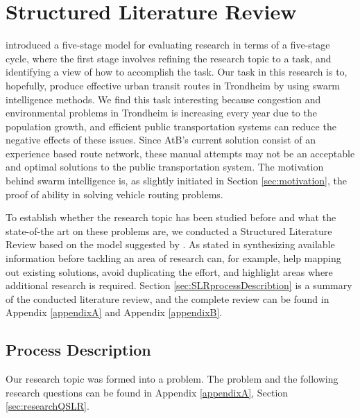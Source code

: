 \section{Structured Literature Review}
\label{sec:structuredLiteratureReview}

\citet{cohen88} introduced a five-stage model for evaluating research in terms of a five-stage cycle, where the first stage involves refining the research topic to a task, and identifying a view of how to accomplish the task. %
Our task in this research is to, hopefully, produce effective urban transit routes in Trondheim by using swarm intelligence methods. We find this task interesting because congestion and environmental problems in Trondheim is increasing every year due to the population growth\citep{website:miljopakken}, and efficient public transportation systems can reduce the negative effects of these issues. Since AtB's\citet{website:atb} current solution consist of an experience based route network, these manual attempts may not be an acceptable and optimal solutions to the public transportation system. The motivation behind swarm intelligence is, as slightly initiated in Section \vref{sec:motivation}, the proof of ability in solving vehicle routing problems. 

To establish whether the research topic has been studied before\citep{cohen88} and what the state-of-the art on these problems are, we conducted a Structured Literature Review based on the model suggested by \citet{kofod2014}. As stated in \citep{kofod2014} synthesizing available information before tackling an area of research can, for example, help mapping out existing solutions, avoid duplicating the effort, and highlight areas where additional research is required. Section \vref{sec:SLRprocessDescribtion} is a summary of the conducted literature review, and the complete review can be found in Appendix \vref{appendixA} and Appendix \vref{appendixB}. 


\subsection{Process Description}
\label{sec:SLRprocessDescribtion}

Our research topic was formed into a problem. The problem and the following research questions can be found in Appendix \ref{appendixA}, Section \vref{sec:researchQSLR}.

